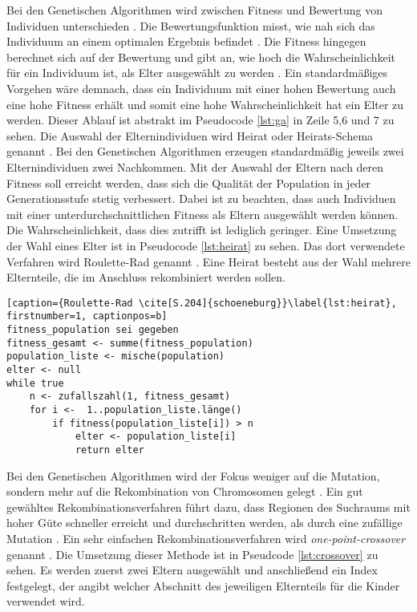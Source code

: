 Bei den Genetischen Algorithmen wird zwischen Fitness und Bewertung von Individuen unterschieden \cite[S. 196]{schoeneburg}. Die Bewertungsfunktion misst, wie nah sich das Individuum an einem optimalen Ergebnis befindet \cite[S. 196]{schoeneburg}.
Die Fitness hingegen berechnet sich auf der Bewertung und gibt an, wie hoch die Wahrscheinlichkeit für ein Individuum ist, als Elter ausgewählt zu werden \cite[S. 196]{schoeneburg}. Ein standardmäßiges Vorgehen wäre demnach, dass ein Individuum mit einer hohen Bewertung auch eine hohe Fitness erhält und somit eine hohe Wahrscheinlichkeit hat ein Elter zu werden.
Dieser Ablauf ist abstrakt im Pseudocode \ref{lst:ga} in Zeile 5,6 und 7 zu sehen.
Die Auswahl der Elternindividuen wird Heirat oder Heirats-Schema genannt \cite[S. 204]{schoeneburg}. Bei den Genetischen Algorithmen erzeugen standardmäßig jeweils zwei Elternindividuen zwei Nachkommen. 
Mit der Auswahl der Eltern nach deren Fitness soll erreicht werden, dass sich die Qualität der Population in jeder Generationsstufe stetig verbessert.
Dabei ist zu beachten, dass auch Individuen mit einer unterdurchschnittlichen Fitness als Eltern ausgewählt werden können. Die Wahrscheinlichkeit, dass dies zutrifft ist lediglich geringer.
Eine Umsetzung der Wahl eines Elter ist in Pseudocode \ref{lst:heirat} zu sehen. Das dort verwendete Verfahren wird Roulette-Rad genannt \cite[S. 204]{schoeneburg}. Eine Heirat besteht aus der Wahl mehrere Elternteile, die im Anschluss rekombiniert werden sollen.
\begin{lstlisting}[caption={Roulette-Rad \cite[S.204]{schoeneburg}}\label{lst:heirat}, firstnumber=1, captionpos=b]
fitness_population sei gegeben
fitness_gesamt <- summe(fitness_population)
population_liste <- mische(population)
elter <- null
while true
	n <- zufallszahl(1, fitness_gesamt)
	for i <-  1..population_liste.länge()
		if fitness(population_liste[i]) > n
			elter <- population_liste[i]
			return elter
\end{lstlisting}
Bei den Genetischen Algorithmen wird der Fokus weniger auf die Mutation, sondern mehr auf die Rekombination von Chromosomen gelegt \cite[S. 198]{schoeneburg}. Ein gut gewähltes Rekombinationsverfahren führt dazu, dass Regionen des Suchraums mit hoher Güte schneller erreicht und durchschritten werden, als durch eine zufällige Mutation \cite[S. 198]{schoeneburg}.
Ein sehr einfachen Rekombinationsverfahren wird \textit{one-point-crossover} genannt \cite[S. 198]{schoeneburg}. Die Umsetzung dieser Methode ist in Pseudcode \ref{lst:crossover} zu sehen. Es werden zuerst zwei Eltern ausgewählt  und anschließend ein Index festgelegt, der angibt welcher Abschnitt des jeweiligen Elternteils für die Kinder verwendet wird.

